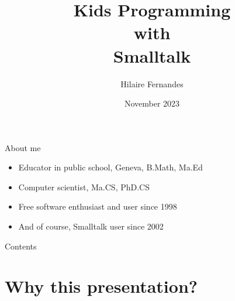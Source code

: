 \documentclass{beamer}
\title{Kids Programming\\ with\\ Smalltalk}
\author{Hilaire Fernandes}
\institute[DIP, Geneva]{Department of Public Instruction \\ Geneva}
\date{November 2023}
\begin{document}
\begin{frame}
  \titlepage
\end{frame}
%
\begin{frame}{About me}
  \fontsize{12pt}{30pt}\selectfont
  \begin{itemize}
  \item Educator in public school, Geneva, B.Math, Ma.Ed
  \item Computer scientist, Ma.CS, PhD.CS
  \item Free software enthusiast and user since 1998
  \item And of course, Smalltalk user since 2002
  \end{itemize}
\end{frame}
%
\begin{frame}{Contents}
  \tableofcontents[hideallsubsections]
\end{frame}


\section{Why this presentation?}
\end{document}

